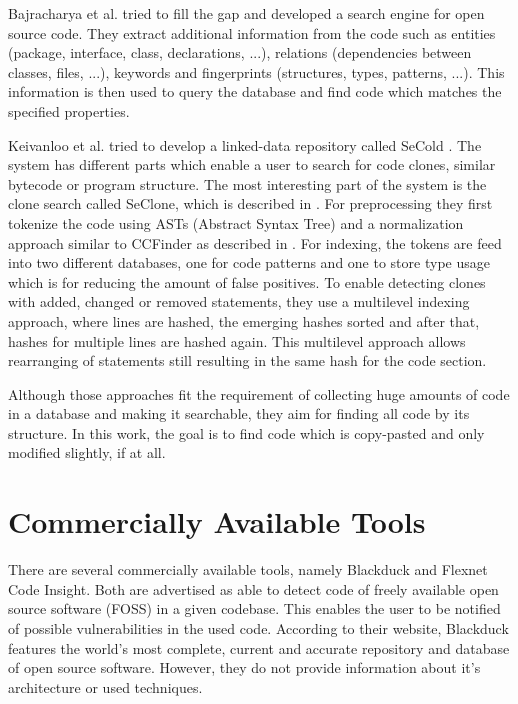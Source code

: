 Bajracharya et al. tried to fill the gap and developed a search engine for open source code.
They extract additional information from the code such as entities (package, interface, class, declarations, ...), relations (dependencies between classes, files, ...), keywords and fingerprints (structures, types, patterns, ...).
This information is then used to query the database and find code which matches the specified properties.

Keivanloo et al. tried to develop a linked-data repository called SeCold \cite{keivanloo2012leveraging,keivanloo2011internet,keivanloo2011seclone,keivanloo2010semantic}.
The system has different parts which enable a user to search for code clones, similar bytecode or program structure.
The most interesting part of the system is the clone search called SeClone, which is described in \cite{keivanloo2011internet,keivanloo2011seclone}.
For preprocessing they first tokenize the code using ASTs (Abstract Syntax Tree) and a normalization approach similar to CCFinder as described in \cite{kamiya2002ccfinder}.
For indexing, the tokens are feed into two different databases, one for code patterns and one to store type usage which is for reducing the amount of false positives.
To enable detecting clones with added, changed or removed statements, they use a multilevel indexing approach, where lines are hashed, the emerging hashes sorted and after that, hashes for multiple lines are hashed again.
This multilevel approach allows rearranging of statements still resulting in the same hash for the code section.

Although those approaches fit the requirement of collecting huge amounts of code in a database and making it searchable, they aim for finding all code by its structure.
In this work, the goal is to find code which is copy-pasted and only modified slightly, if at all.

\section{Commercially Available Tools}
There are several commercially available tools, namely Blackduck and Flexnet Code Insight.
Both are advertised as able to detect code of freely available open source software (FOSS) in a given codebase.
This enables the user to be notified of possible vulnerabilities in the used code.
According to their website, Blackduck features \glqq the world’s most complete, current and accurate repository and database of open source software\grqq\cite{blackduck}.
However, they do not provide information about it's architecture or used techniques.

